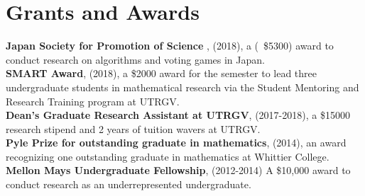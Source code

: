 \documentclass[letterpaper]{article}
\begin{document}
\section*{\textbf{Grants and Awards}}
\textbf{Japan Society for Promotion of Science }, (2018), a  (~\$5300) award to conduct research on algorithms and voting games in Japan.  \vspace{.2cm}\\
\textbf{SMART Award}, (2018), a \$2000 award for the semester to lead three undergraduate students in mathematical research via the Student Mentoring and Research Training program at UTRGV.  \vspace{.2cm}\\
\textbf{Dean's Graduate Research Assistant at UTRGV}, (2017-2018), a \$15000 research stipend and 2 years of tuition wavers at UTRGV.  \vspace{.2cm}\\
\textbf{Pyle Prize for outstanding graduate in mathematics}, (2014), an award recognizing one outstanding graduate in mathematics at Whittier College. \vspace{.2cm}\\
\textbf{Mellon Mays Undergraduate Fellowship}, (2012-2014) A \$10,000 award to conduct research as an underrepresented undergraduate. 
\end{document}
